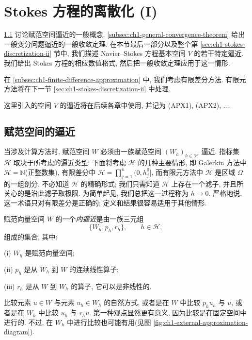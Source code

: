 \clearpage
\section{Stokes 方程的离散化 (I)}
\label{sec:ch1-stokes-discretization-i}

\ref{subsec:ch1-normed-space-approximation} 讨论赋范空间逼近的一般概念, \ref{subsec:ch1-general-convergence-theorem} 给出一般变分问题逼近的一般收敛定理. 在本节最后一部分以及整个第 \ref{sec:ch1-stokes-discretization-ii} 节中, 我们描述 Navier--Stokes 方程基本空间 $V$ 的若干特定逼近. 我们给出 Stokes 方程的相应数值格式, 然后把一般收敛定理应用于这一情形.

在 \ref{subsec:ch1-finite-difference-approximation} 中, 我们考虑有限差分方法. 有限元方法将在下一节 \ref{sec:ch1-stokes-discretization-ii} 中处理.

这里引入的空间 $V$ 的逼近将在后续各章中使用, 并记为 (APX1), (APX2), $\ldots$.

\subsection{赋范空间的逼近}
\label{subsec:ch1-normed-space-approximation}

当涉及计算方法时, 赋范空间 $W$ 必须由一族赋范空间 $(W_h)_{h\in\mathcal H}$ 逼近. 指标集 $\mathcal H$ 取决于所考虑的逼近类型: 下面将考虑 $\mathcal H$ 的几种主要情形, 即 Galerkin 方法中 $\mathcal H=\mathbb N$(正整数集), 有限差分中 $\mathcal H=\prod_{j=1}^n(0,h_j^0]$, 而有限元方法中 $\mathcal H$ 是区域 $\Omega$ 的一组剖分. 不必知道 $\mathcal H$ 的精确形式; 我们只需知道 $\mathcal H$ 上存在一个滤子, 并且所关心的是沿此滤子取极限. 为简单起见, 我们总把这一过程称为 $h\to0$. 严格地说, 这一术语只对有限差分是正确的; 定义和结果很容易适用于其他情形.

\begin{Definition}
\label{def:ch1-internal-approximation}
赋范向量空间 $W$ 的一个\emph{内逼近}是由一族三元组
\[
\{W_h,p_h,r_h\},\qquad h\in\mathcal H,
\]
组成的集合, 其中:

(i) $W_h$ 是赋范向量空间;

(ii) $p_h$ 是从 $W_h$ 到 $W$ 的连续线性算子;

(iii) $r_h$ 是从 $W$ 到 $W_h$ 的算子, 它可以是非线性的.
\end{Definition}

比较元素 $u\in W$ 与元素 $u_h\in W_h$ 的自然方式, 或者是在 $W$ 中比较 $p_hu_h$ 与 $u$, 或者是在 $W_h$ 中比较 $u_h$ 与 $r_hu$. 第一种观点显然更有意义, 因为比较是在固定空间中进行的. 不过, 在 $W_h$ 中进行比较也可能有用(见图 \ref{fig:ch1-external-approximation-diagram}).


